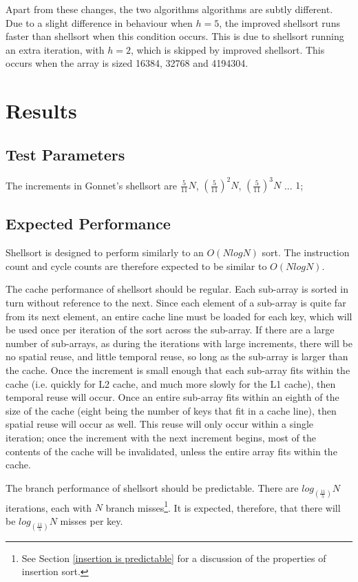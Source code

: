 Apart from these changes, the two algorithms algorithms are subtly different.
Due to a slight difference in behaviour when $h = 5$, the improved shellsort
runs faster than shellsort when this condition occurs. This is due to shellsort
running an extra iteration, with $h = 2$, which is skipped by improved
shellsort. This occurs when the array is sized 16384, 32768 and 4194304. 



\section{Results}
\subsection{Test Parameters}
The increments in Gonnet's shellsort are $\frac{5}{11}N$, $(\frac{5}{11})^2N$,
$(\frac{5}{11})^3N$ ... $1$;

\subsection{Expected Performance}
Shellsort is designed to perform similarly to an $O(NlogN)$ sort. The instruction
count and cycle counts are therefore expected to be similar to $O(NlogN)$.

The cache performance of shellsort should be regular. Each sub-array is sorted in
turn without reference to the next. Since each element of a sub-array is quite
far from its next element, an entire cache line must be loaded for each key,
which will be used once per iteration of the sort across the sub-array. If there
are a large number of sub-arrays, as during the iterations with large increments,
there will be no spatial reuse, and little temporal reuse, so long as the
sub-array is larger than the cache. Once the increment is small enough that each
sub-array fits within the cache (i.e. quickly for L2 cache, and much more slowly
for the L1 cache), then temporal reuse will occur. Once an entire sub-array fits
within an eighth of the size of the cache (eight being the number of keys that
fit in a cache line), then spatial reuse will occur as well. This reuse will
only occur within a single iteration; once the increment with the next increment
begins, most of the contents of the cache will be invalidated, unless the entire
array fits within the cache.

The branch performance of shellsort should be predictable. There are
$log_{(\frac{11}{5})}N$ iterations, each with $N$ branch misses\footnote{See
Section \ref{insertion is predictable} for a discussion of the properties of
insertion sort.}. It is expected, therefore, that there will be
$log_{(\frac{11}{5})}N$ misses per key.

